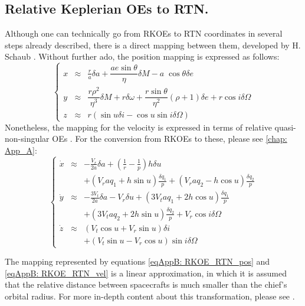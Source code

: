 	\subsection{Relative Keplerian OEs to RTN.}
	\indent Although one can technically go from RKOEs to RTN coordinates in several steps already described, there is a direct mapping between them, developed by H. Schaub \cite{Schaub2004}. Without further ado, the position mapping is expressed as follows:
	\begin{equation}
	\left\{ \begin{array}{lll}
	x  	& \approx & \frac{r}{a} \delta a + \dfrac{ae\sin\theta}{\eta} \delta M - a\; \cos\theta \delta e\\
	y	& \approx & \dfrac{r\rho^2}{\eta^3} \delta M + r\delta\omega + \dfrac{r\sin\theta }{\eta^2} (\rho + 1) \delta e + r\cos i \delta\Omega \\
	z	& \approx & r\left(\sin u \delta i - \cos u \sin i \delta \Omega\right)
	\end{array}\right.
	\label{eqAppB: 	RKOE_RTN_pos}
	\end{equation}
	\indent Nonetheless, the mapping for the velocity is expressed in terms of relative quasi-non-singular OEs \cite{Schaub_Alfriend}. For the conversion from RKOEs to these, please see \ref{chap: App_A}:
	\begin{equation}
	\left\{ \begin{array}{lll}
	\dot{x}	& \approx & -\frac{V_{r}}{2 a} \delta a+\left(\frac{1}{r}-\frac{1}{p}\right) h \delta u \\
	 & & +\left(V_{r} a q_{1}+h \sin u\right) \frac{\delta q_{1}}{p}+\left(V_{r} a q_{2}-h \cos u\right) \frac{\delta q_{2}}{p} \\
	\dot{y}	& \approx & -\frac{3 V_{t}}{2 a} \delta a-V_{r} \delta u+\left(3 V_{t} a q_{1}+2 h \cos u\right) \frac{\delta q_{1}}{p} \\
	 & &+\left(3 V_{t} a q_{2}+2 h \sin u\right) \frac{\delta q_{2}}{p}+V_{r} \cos i \delta \Omega \\
	\dot{z} & \approx & \left(V_{t} \cos u+V_{r} \sin u\right) \delta i \\
	 & &+\left(V_{t} \sin u-V_{r} \cos u\right) \sin i \delta \Omega
	\end{array}\right.
	\label{eqAppB: 	RKOE_RTN_vel}
	\end{equation}
	
	\indent The mapping represented by equations \eqref{eqAppB: 	RKOE_RTN_pos} and \eqref{eqAppB: 	RKOE_RTN_vel} is a linear approximation, in which it is assumed that the relative distance between spacecrafts is much smaller than the chief's orbital radius. For more in-depth content about this transformation, please see \cite{Schaub2004, Schaub_Alfriend}.
